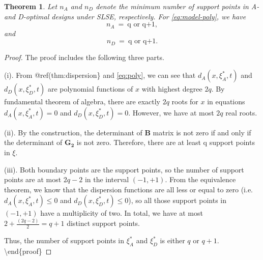 \documentclass[
]{book}
\newtheorem{theorem}{Theorem}[chapter]
\theoremstyle{definition}
\theoremstyle{definition}
\theoremstyle{definition}
\theoremstyle{definition}
\theoremstyle{remark}
\begin{document}
\begin{theorem}
\protect\hypertarget{thm:support}{}\label{thm:support}Let \(n_A\) and \(n_D\) denote the minimum number of support points in A- and D-optimal designs under SLSE, respectively. For \eqref{eq:model-poly}, we have
\begin{equation} \label{support}
n_A ~ = ~ \text{q or q+1},
\end{equation}
and
\begin{equation} \label{support2}
n_D ~ = ~ \text{q or q+1}.
\end{equation}
\end{theorem}

\begin{proof}
The proof includes the following three parts.

(i). From @ref(thm:dispersion\} and \eqref{eq:poly}, we can see that \(d_A(x,\xi_A^*,t)\) and \(d_D(x,\xi_D^*,t)\) are polynomial functions of \(x\) with highest degree \(2q\). By fundamental theorem of algebra, there are exactly \(2q\) roots for \(x\) in equations \(d_A(x,\xi_A^*,t)=0\) and \(d_D(x,\xi_D^*,t)=0\). However, we have at most \(2q\) real roots.

(ii). By the construction, the determinant of \(\boldsymbol{B}\) matrix is not zero if and only if the determinant of \(\boldsymbol{G_2}\) is not zero. Therefore, there are at least q support points in \(\xi\).

(iii). Both boundary points are the support points, so the number of support points are at most \(2q-2\) in the interval \((-1, +1)\). From the equivalence theorem, we know that the dispersion functions are all less or equal to zero (i.e.~\(d_A(x,\xi_A^*,t)\leq 0\) and \(d_D(x,\xi_D^*,t)\leq 0\)), so all those support points in \((-1,+1)\) have a multiplicity of two. In total, we have at most \(2+\frac{(2q-2)}{2}=q+1\) distinct support points.

Thus, the number of support points in \(\xi_A^*\) and \(\xi_D^*\) is either \(q\) or \(q+1\).
\textbackslash end\{proof\}
\end{proof}
\end{document}
